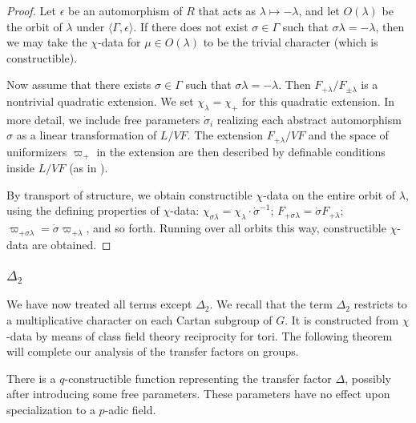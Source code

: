\begin{proof}
Let $\epsilon$ be an automorphism of $R$ that acts as $\lambda\mapsto -\lambda$, and let $O(\lambda)$ be the orbit of $\lambda$ under $\langle\Gamma,\epsilon\rangle$.
If there does not exist $\sigma\in\Gamma$ such that $\sigma\lambda=-\lambda$, then we may take the $\chi$-data for $\mu\in O(\lambda)$ to be the trivial character
(which is constructible).   

Now assume that there exists $\sigma\in\Gamma$ such that $\sigma\lambda = -\lambda$.  Then $F_{+\lambda}/F_{\pm \lambda}$ is a nontrivial quadratic extension.
We set $\chi_\lambda = \chi_+$ for this quadratic extension.  
In more detail,
we include free parameters $\dot\sigma_i$ realizing each abstract automorphism $\sigma$ as a linear transformation of $L/VF$.
The extension $F_{+\lambda}/VF$ and the space of uniformizers $\varpi_+$ in the extension are then described by definable conditions inside $L/VF$ (as in \cite{cluckers2011transfer}).

By transport of structure, we obtain constructible $\chi$-data on the entire orbit of $\lambda$, using the defining properties of $\chi$-data:
$\chi_{\sigma\lambda} = \chi_{\lambda}\cdot \dot\sigma^{-1}$; $F_{+\sigma\lambda}=\dot\sigma F_{+\lambda}$; $\varpi_{+\sigma\lambda}=\dot\sigma\varpi_{+\lambda}$,
and so forth.   Running over all orbits this way, constructible $\chi$-data are obtained.
\end{proof}


\subsubsection{$\Delta_2$}

We have now treated all terms except $\Delta_2$.
We recall that the term $\Delta_2$ restricts to a multiplicative character on each Cartan subgroup of $G$.  It is constructed from $\chi$-data by
means of class field theory reciprocity for tori.  The following theorem will complete our analysis of the transfer factors on groups.

\begin{theorem}\label{thm:delta2}  There is a $q$-constructible function representing the transfer factor $\Delta$, 
possibly after introducing some free parameters.  These parameters  have no effect upon specialization to a $p$-adic field.
\end{theorem}






